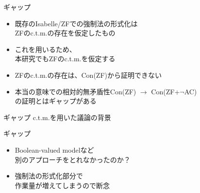 \documentclass[17pt,aspectratio=169]{beamer}
\begin{document}
\begin{frame}{ギャップ}
    \vspace{-15pt}
    \,
    {\small 
    \begin{itemize}[itemsep=5pt]
        \item 既存のIsabelle/ZFでの強制法の形式化は\\ZFのc.t.m.の存在を仮定したもの
        \item これを用いるため、\\本研究でもZFのc.t.m.を仮定する
        \item ZFのc.t.m.の存在は、Con(ZF)から証明できない
        \item 本当の意味での相対的無矛盾性Con(ZF) $\rightarrow$ Con(ZF+$\neg$AC)\\
        の証明とはギャップがある
    \end{itemize}
    }
\end{frame}

\begin{frame}{ギャップ}
    c.t.m.を用いた議論の背景
\end{frame}

\begin{frame}{ギャップ}
    \begin{itemize} 
        \item Boolean-valued modelなど\\
              別のアプローチをとれなかったのか？
        \item 強制法の形式化部分で\\作業量が増えてしまうので断念
    \end{itemize}    
\end{frame}
\end{document}
